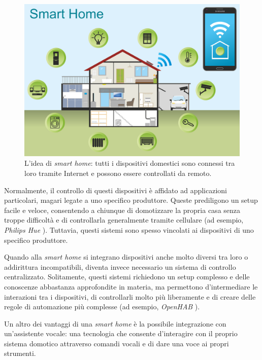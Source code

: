 \begin{figure}[!ht]
  \centering
  \includegraphics[scale=0.30]{resources/images/other/smart-home-example.png}
  \caption{
    L'idea di \textit{smart home}: tutti i dispositivi domestici sono connessi
    tra loro tramite Internet e possono essere controllati da remoto.
  }
  \label{fig:figure1.1}
\end{figure}

Normalmente, il controllo di questi dispositivi è affidato ad applicazioni
particolari, magari legate a uno specifico produttore. Queste prediligono un
setup facile e veloce, consentendo a chiunque di domotizzare la propria casa
senza troppe difficoltà e di controllarla generalmente tramite cellulare (ad
esempio, \textit{Philips Hue} \cite{PHILIPS}). Tuttavia, questi sistemi sono
spesso vincolati ai dispositivi di uno specifico produttore.

Quando alla \textit{smart home} si integrano dispositivi anche molto diversi
tra loro o addirittura incompatibili, diventa invece necessario un sistema di
controllo centralizzato. Solitamente, questi sistemi richiedono un setup
complesso e delle conoscenze abbastanza approfondite in materia, ma permettono
d'intermediare le interazioni tra i dispositivi, di controllarli molto più
liberamente e di creare delle regole di automazione più complesse (ad esempio,
\textit{OpenHAB} \cite{OPENHAB}).

Un altro dei vantaggi di una \textit{smart home} è la possibile integrazione
con un’assistente vocale: una tecnologia che consente d'interagire con il
proprio sistema domotico attraverso comandi vocali e di dare una voce ai propri
strumenti.

